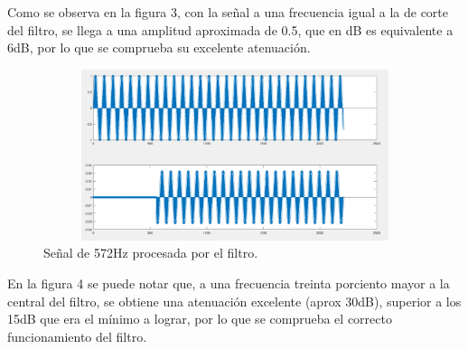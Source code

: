 \documentclass[12pt]{article}
\begin{document}
Como se observa en la figura 3, con la señal a una frecuencia igual a la de corte del filtro, se llega a una amplitud aproximada de 0.5, que en dB es equivalente a 6dB, por lo que se comprueba su excelente atenuación.
\vspace{80mm}
\begin{figure}[h]
    \centering
    \includegraphics[width=14cm,height=5cm]{imagenes/respFIR_572.png}
    \caption{Señal de 572Hz procesada por el filtro.}
\end{figure}

En la figura 4 se puede notar que, a una frecuencia treinta porciento mayor a la central del filtro, se obtiene una atenuación excelente (aprox 30dB), superior a los 15dB que era el mínimo a lograr, por lo que se comprueba el correcto funcionamiento del filtro.
\end{document}
